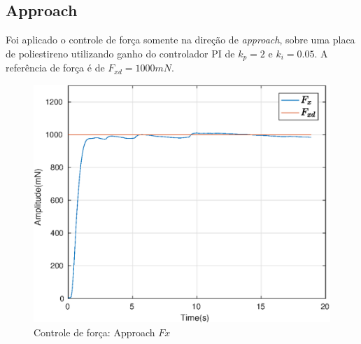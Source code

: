 \subsection{Approach}

Foi aplicado o controle de força somente na direção de \textit{approach}, sobre uma placa de poliestireno utilizando ganho do controlador PI de $k_p = 2$ e $k_i = 0.05$. A referência de força é de $F_{xd} = 1000 mN$.

 \begin{figure}[H]
  \centering
  \includegraphics[width=0.5\linewidth]{./img/force1000_kp2_ki005/Fx.eps}
  \caption{Controle de força: Approach $Fx$}
  \label{fig:sub2}
\end{figure}